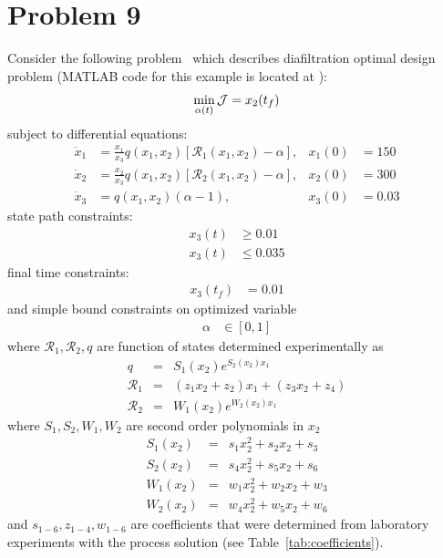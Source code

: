 \section{Problem 9}
\label{sec:prob7}

Consider the following problem~\citep{fik10jms} which describes
diafiltration optimal design problem (MATLAB code for this example is located at
):
\begin{equation}
  \min_{\alpha(t)} \mathcal{J} = x_2(t_f)
\end{equation}
subject to differential equations:
\begin{align}
  \dot{x}_1 & = \frac{x_1}{ x_3}
q(x_1, x_2)\left[\mathcal{R}_1(x_1, x_2)-\alpha \right], &
 x_1(0) &= 150  \\
\dot{x}_2 & = \frac{x_2}{ x_3}
q(x_1, x_2)\left[\mathcal{R}_2(x_1, x_2)-\alpha\right], &
 x_2(0) &= 300 \\
\dot{x}_3 &= q(x_1, x_2)(\alpha - 1), &
x_3(0) &= 0.03 
\end{align}
state path constraints:
\begin{align}
  x_3(t) &\ge 0.01 \\
  x_3(t) &\le 0.035
\end{align}
final time constraints:
\begin{align}
  x_3(t_f) &= 0.01 
\end{align}
and simple bound constraints on optimized variable
\begin{align}
  \alpha &\in [0, 1] 
\end{align}
where $\mathcal{R}_1, \mathcal{R}_2, q$ are function of states
determined experimentally as 
\begin{eqnarray} 
q &=& S_1(x_2) e^{S_2(x_2) x_1} \label{eq:Jempiric} \\
\mathcal{R}_1 &=& (z_1 x_2+z_2) x_1  +  ( z_3 x_2+z_4) \label{eq:R1empiric} \\
\mathcal{R}_2 &=& W_1(x_2) e^{W_2(x_2) x_1}	\label{eq:R2empiric}
\end{eqnarray}
where $S_1, S_2, W_1, W_2$ are second order polynomials in $x_2$
\begin{eqnarray} 
S_1(x_2) &=& s_1 x_2^2 + s_2 x_2+s_3 \\
S_2(x_2) &=& s_4 x_2^2 + s_5 x_2+s_6 \\
W_1(x_2) &=& w_1 x_2^2 + w_2 x_2+w_3 \\
W_2(x_2) &=& w_4 x_2^2 + w_5 x_2+w_6 \label{eq:W}
\end{eqnarray}
and $s_{1-6}, z_{1-4},w_{1-6}$ are coefficients that were determined
from laboratory experiments with the process solution
(see Table~\ref{tab:coefficients}).


